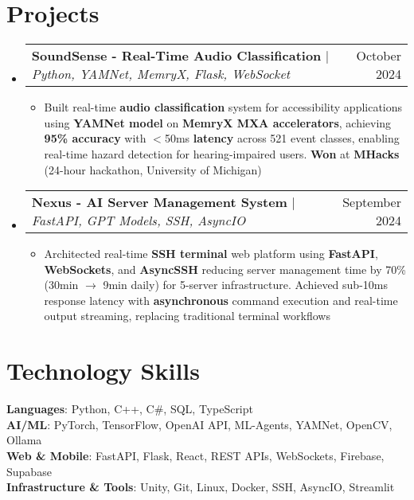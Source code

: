 \documentclass[letterpaper,11pt]{article}
\makeatletter
\newcommand{\resumeItem}[1]{
  \item\small{
    {#1 \vspace{-2pt}}
  }
}
\newcommand{\resumeProjectHeading}[2]{
    \item
    \begin{tabular*}{0.97\textwidth}{l@{\extracolsep{\fill}}r}
      \small#1 & #2 \\
    \end{tabular*}\vspace{-7pt}
}
\newcommand{\resumeSubHeadingListStart}{\begin{itemize}[leftmargin=0.15in, label={}]}
\newcommand{\resumeSubHeadingListEnd}{\end{itemize}}
\newcommand{\resumeItemListStart}{\begin{itemize}}
\newcommand{\resumeItemListEnd}{\end{itemize}\vspace{-5pt}}
\makeatother
\begin{document}
\section{Projects}
    \resumeSubHeadingListStart
      \resumeProjectHeading
          {\textbf{SoundSense - Real-Time Audio Classification} $|$ \emph{Python, YAMNet, MemryX, Flask, WebSocket}}{October 2024}
          \resumeItemListStart
            \resumeItem{Built real-time \textbf{audio classification} system for accessibility applications using \textbf{YAMNet model} on \textbf{MemryX MXA accelerators}, achieving \textbf{95\% accuracy} with $<$50ms \textbf{latency} across 521 event classes, enabling real-time hazard detection for hearing-impaired users. \textbf{Won} at \textbf{MHacks} (24-hour hackathon, University of Michigan)}
          \resumeItemListEnd
      \resumeProjectHeading
          {\textbf{Nexus - AI Server Management System} $|$ \emph{FastAPI, GPT Models, SSH, AsyncIO}}{September 2024}
          \resumeItemListStart
            \resumeItem{Architected real-time \textbf{SSH terminal} web platform using \textbf{FastAPI}, \textbf{WebSockets}, and \textbf{AsyncSSH} reducing server management time by 70\% (30min $\rightarrow$ 9min daily) for 5-server infrastructure. Achieved sub-10ms response latency with \textbf{asynchronous} command execution and real-time output streaming, replacing traditional terminal workflows}
          \resumeItemListEnd
    \resumeSubHeadingListEnd

\section{Technology Skills}
 \begin{itemize}[leftmargin=0.15in, label={}]
    \small{\item{
     \textbf{Languages}{: Python, C++, C\#, SQL, TypeScript} \\
     \textbf{AI/ML}{: PyTorch, TensorFlow, OpenAI API, ML-Agents, YAMNet, OpenCV, Ollama} \\
     \textbf{Web \& Mobile}{: FastAPI, Flask, React, REST APIs, WebSockets, Firebase, Supabase} \\
     \textbf{Infrastructure \& Tools}{: Unity, Git, Linux, Docker, SSH, AsyncIO, Streamlit}
    }}
 \end{itemize}

\end{document}
